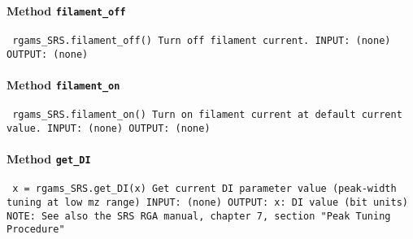 \paragraph{Method \texttt{filament_off}}
\vspace{1ex}
\texttt{\newline
rgams_SRS.filament_off()\newline
\newline
Turn off filament current.\newline
\newline
INPUT:\newline
(none)\newline
\newline
OUTPUT:\newline
(none)\newline
\newline
}

\paragraph{Method \texttt{filament_on}}
\vspace{1ex}
\texttt{\newline
rgams_SRS.filament_on()\newline
\newline
Turn on filament current at default current value.\newline
\newline
INPUT:\newline
(none)\newline
\newline
OUTPUT:\newline
(none)\newline
\newline
}

\paragraph{Method \texttt{get_DI}}
\vspace{1ex}
\texttt{\newline
x = rgams_SRS.get_DI(x)\newline
\newline
Get current DI parameter value (peak-width tuning at low mz range)\newline
\newline
INPUT:\newline
(none)\newline
\newline
OUTPUT:\newline
x: DI value (bit units)\newline
\newline
NOTE:\newline
See also the SRS RGA manual, chapter 7, section "Peak Tuning Procedure"\newline
\newline
}

